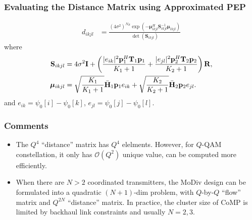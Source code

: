 \documentclass{beamer}
\begin{document}
\begin{frame}
  \frametitle{Evaluating the Distance Matrix using Approximated PEP}
  \begin{align*}
    d_{ikjl} & =
    \frac{(4\sigma^2)^{N_R}
    \exp(-\bm{\mu}_{ikjl}^H\mathbf{S}_{ikjl}^{-1}\bm{\mu}_{ikjl})} {\det(\mathbf{S}_{ikjl})}
  \end{align*}
  where
  \begin{align*}
    \mathbf{S}_{ikjl} & = 4\sigma^2\mathbf{I} + \left(\frac{|e_{ik}|^2
    \mathbf{p}_1^H\mathbf{T}_1 \mathbf{p}_1}{K_1+1} + \frac{|e_{jl}|^2
    \mathbf{p}_2^H\mathbf{T}_2 \mathbf{p}_2}{K_2+1}\right) \mathbf{R},\notag\\
    \bm{\mu}_{ikjl} & = \sqrt{\frac{K_1}{K_1+1}}\bar{\mathbf{H}}_1\mathbf{p}_1
    e_{ik} + \sqrt{\frac{K_2}{K_2+1}}\bar{\mathbf{H}}_2\mathbf{p}_2e_{jl}.
  \end{align*}
  and $e_{ik} = \psi_0[i] - \psi_0[k]$, $e_{jl} = \psi_0[j] - \psi_0[l]$.
\end{frame}

\begin{frame}
  \frametitle{Comments}
  
  \begin{itemize}
    \item The $Q^4$ ``distance'' matrix has $Q^4$ elelments. However, for
    $Q$-QAM constellation, it only has $\mathcal{O}(Q^2)$ unique value, can be
    computed more efficiently.
    \item When there are $N > 2$ coordinated transmitters, the MoDiv design can
    be formulated into a quadratic $(N + 1)$-dim problem, with
    $Q$-by-$Q$ ``flow'' matrix and $Q ^ {2N}$ ``distance'' matrix. In practice,
    the cluster size of CoMP is limited by backhaul link constraints and usually
    $N=2,3$.
  \end{itemize}
\end{frame}
\end{document}
